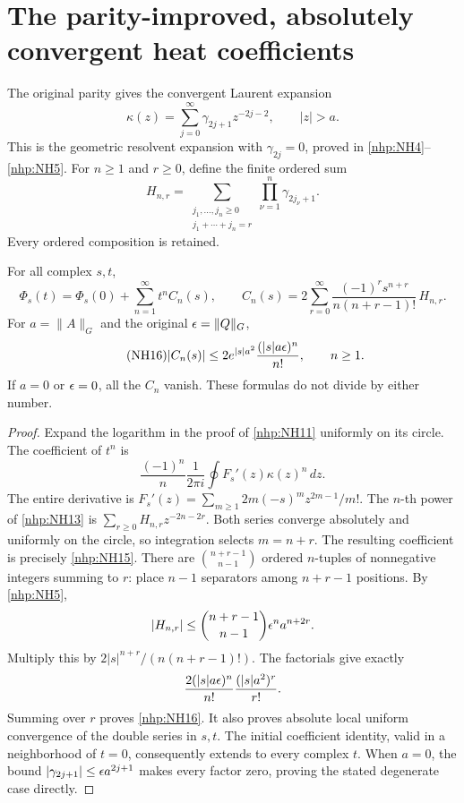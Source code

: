 \section{The parity-improved, absolutely convergent heat coefficients}

The original parity gives the convergent Laurent expansion
\begin{equation}\tag{NH13}\label{nhp:NH13}
\kappa(z)=\sum_{j=0}^\infty
\gamma_{2j+1}z^{-2j-2},\qquad |z|>a .
\end{equation}
This is the geometric resolvent expansion with
\(\gamma_{2j}=0\), proved in \eqref{nhp:NH4}--\eqref{nhp:NH5}.
For \(n\ge1\) and \(r\ge0\), define the finite ordered sum
\begin{equation}\tag{NH14}\label{nhp:NH14}
H_{n,r}=
\sum_{\substack{j_1,\ldots,j_n\ge0\\j_1+\cdots+j_n=r}}
\prod_{\nu=1}^n\gamma_{2j_\nu+1}.
\end{equation}
Every ordered composition is retained.

\begin{nhptheorem}
For all complex \(s,t\),
\begin{equation}\tag{NH15}\label{nhp:NH15}
\Phi_s(t)=\Phi_s(0)+\sum_{n=1}^\infty t^n C_n(s),\qquad
C_n(s)=2\sum_{r=0}^\infty
\frac{(-1)^r s^{n+r}}{n(n+r-1)!}\,H_{n,r}.
\end{equation}
For \(a=\|A\|_G\) and the original \(\epsilon=\|Q\|_G\),
\begin{equation}\tag{NH16}\label{nhp:NH16}
|C_n(s)|\le
2e^{|s|a^2}\frac{(|s|a\epsilon)^n}{n!},\qquad n\ge1.
\end{equation}
If \(a=0\) or \(\epsilon=0\), all the \(C_n\) vanish.
These formulas do not divide by either number.
\end{nhptheorem}
\begin{proof}
Expand the logarithm in the proof of \eqref{nhp:NH11}
uniformly on its circle. The coefficient of \(t^n\) is
\[
\frac{(-1)^n}{n}\frac1{2\pi i}
\oint F_s'(z)\kappa(z)^n\,dz .
\]
The entire derivative is
\(F_s'(z)=\sum_{m\ge1}2m(-s)^m z^{2m-1}/m!\).
The \(n\)-th power of \eqref{nhp:NH13} is
\(\sum_{r\ge0}H_{n,r}z^{-2n-2r}\).
Both series converge absolutely and uniformly on the
circle, so integration selects \(m=n+r\).
The resulting coefficient is precisely \eqref{nhp:NH15}.
There are \(\binom{n+r-1}{n-1}\) ordered \(n\)-tuples
of nonnegative integers summing to \(r\): place \(n-1\)
separators among \(n+r-1\) positions. By \eqref{nhp:NH5},
\[
|H_{n,r}|\le
\binom{n+r-1}{n-1}\epsilon^n a^{n+2r}.
\]
Multiply this by \(2|s|^{n+r}/(n(n+r-1)!)\).
The factorials give exactly
\[
\frac{2(|s|a\epsilon)^n}{n!}\frac{(|s|a^2)^r}{r!}.
\]
Summing over \(r\) proves \eqref{nhp:NH16}.
It also proves absolute local uniform convergence of the
double series in \(s,t\). The initial coefficient identity,
valid in a neighborhood of \(t=0\), consequently extends
to every complex \(t\). When \(a=0\), the bound
\(|\gamma_{2j+1}|\le\epsilon a^{2j+1}\) makes every factor
zero, proving the stated degenerate case directly.
\end{proof}

